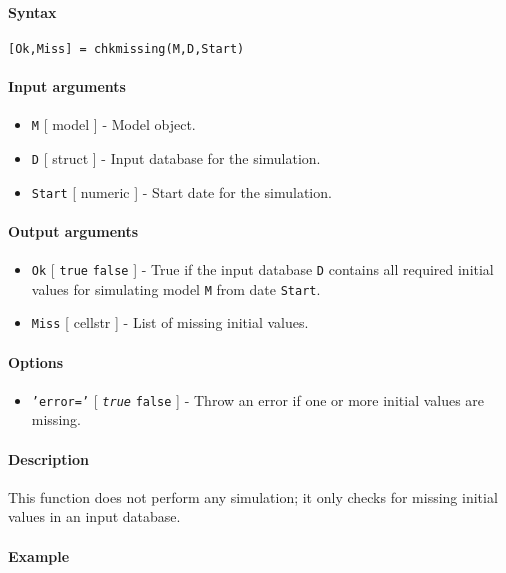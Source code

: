 


	\paragraph{Syntax}\label{syntax}

\begin{verbatim}
[Ok,Miss] = chkmissing(M,D,Start)
\end{verbatim}

\paragraph{Input arguments}\label{input-arguments}

\begin{itemize}
\item
  \texttt{M} {[} model {]} - Model object.
\item
  \texttt{D} {[} struct {]} - Input database for the simulation.
\item
  \texttt{Start} {[} numeric {]} - Start date for the simulation.
\end{itemize}

\paragraph{Output arguments}\label{output-arguments}

\begin{itemize}
\item
  \texttt{Ok} {[} \texttt{true} \textbar{} \texttt{false} {]} - True if
  the input database \texttt{D} contains all required initial values for
  simulating model \texttt{M} from date \texttt{Start}.
\item
  \texttt{Miss} {[} cellstr {]} - List of missing initial values.
\end{itemize}

\paragraph{Options}\label{options}

\begin{itemize}
\itemsep1pt\parskip0pt
\item
  \texttt{'error='} {[} \emph{\texttt{true}} \textbar{} \texttt{false}
  {]} - Throw an error if one or more initial values are missing.
\end{itemize}

\paragraph{Description}\label{description}

This function does not perform any simulation; it only checks for
missing initial values in an input database.

\paragraph{Example}\label{example}


